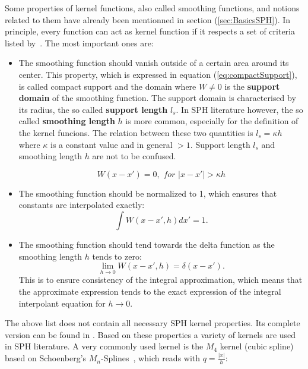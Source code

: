 \documentclass{report}
\newcommand{\norm}[1]{\left|#1\right|}
\begin{document}
Some properties of kernel functions, also called smoothing functions, and notions related
to them have already been mentionned in section
(\ref{sec:BasicsSPH}). In principle, every function can act as kernel function
if it respects a set of criteria listed by~\cite{Liu2003}.
The most important ones are:
\begin{itemize}
\item The smoothing function should vanish outside of a certain area around its
center. This property, which is expressed in equation (\ref{eq:compactSupport}), is called compact support and the domain where $W\neq0$
is the {\bf support domain} of the smoothing function.  The support domain is characterised by its radius, the so called {\bf support length} $l_s$. In SPH literature however, the so called {\bf smoothing length} $h$ is more common, especially for the definition of the kernel funcions. The relation between these two quantities is $l_s=\kappa h$ where $\kappa$ is a constant value and in general $>1$. Support length $l_s$ and smoothing length $h$ are not to be confused.
 
\begin{equation}
\label{eq:compactSupport}
W(x-x')=0,\textit{ \ for \ }|x-x'|>\kappa h
\end{equation}

\item The smoothing function should be normalized to 1, which ensures that constants
are interpolated exactly:
\begin{equation}
\int{W(x-x',h)dx'}=1.
\end{equation}

\item The smoothing function should tend towards the delta function as the smoothing
length $h$ tends to zero:
\begin{equation}
\lim\limits_{h \rightarrow 0}{W(x-x',h)}=\delta(x-x').
\end{equation}
This is to ensure consistency of the integral approximation, which means that
the approximate expression tends to the exact expression of the integral
interpolant equation for $h \rightarrow 0$.
\end{itemize}
The above list does not contain all necessary SPH kernel properties. Its complete version can be found in \cite{Liu2003}.
Based on these properties a variety of kernels are used in SPH literature. A
very commonly used kernel is the $M_4$ kernel (cubic spline) based on Schoenberg's
$M_n$-Splines~\cite{Schoenberg1946}, which reads with $q=\frac{\norm{x}}{h}$:
\end{document}
